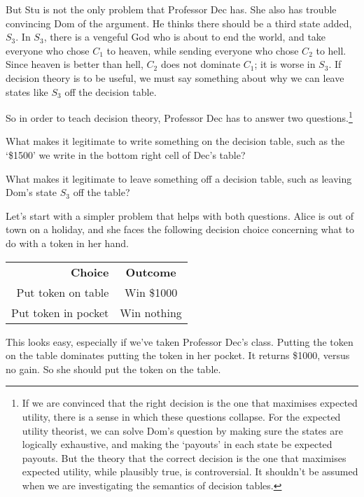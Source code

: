 \documentclass[11pt,oneside]{book}
\begin{document}
But Stu is not the only problem that Professor Dec has. She also has trouble convincing Dom of the argument. He thinks there should be a third state added, $S_3$. In $S_3$, there is a vengeful God who is about to end the world, and take everyone who chose $C_1$ to heaven, while sending everyone who chose $C_2$ to hell. Since heaven is better than hell, $C_2$ does not dominate $C_1$; it is worse in $S_3$. If decision theory is to be useful, we must say something about why we can leave states like $S_3$ off the decision table.

So in order to teach decision theory, Professor Dec has to answer two questions.\footnote{If we are convinced that the right decision is the one that maximises expected utility, there is a sense in which these questions collapse. For the expected utility theorist, we can solve Dom's question by making sure the states are logically exhaustive, and making the `payouts' in each state be expected payouts. But the theory that the correct decision is the one that maximises expected utility, while plausibly true, is controversial. It shouldn't be assumed when we are investigating the semantics of decision tables.}

\begin{enumerate*}
\item What makes it legitimate to write something on the decision table, such as the `\$1500' we write in the bottom right cell of Dec's table?
\item What makes it legitimate to leave something off a decision table, such as leaving Dom's state $S_3$ off the table?
\end{enumerate*}

\noindent Let's start with a simpler problem that helps with both questions. Alice is out of town on a holiday, and she faces the following decision choice concerning what to do with a token in her hand.

\begin{center}
\begin{tabular}{r c}
\textbf{Choice} & \textbf{Outcome} \\
Put token on table & Win \$1000 \\
Put token in pocket & Win nothing
\end{tabular}
\end{center}

\noindent This looks easy, especially if we've taken Professor Dec's class. Putting the token on the table dominates putting the token in her pocket. It returns \$1000, versus no gain. So she should put the token on the table.
\end{document}
